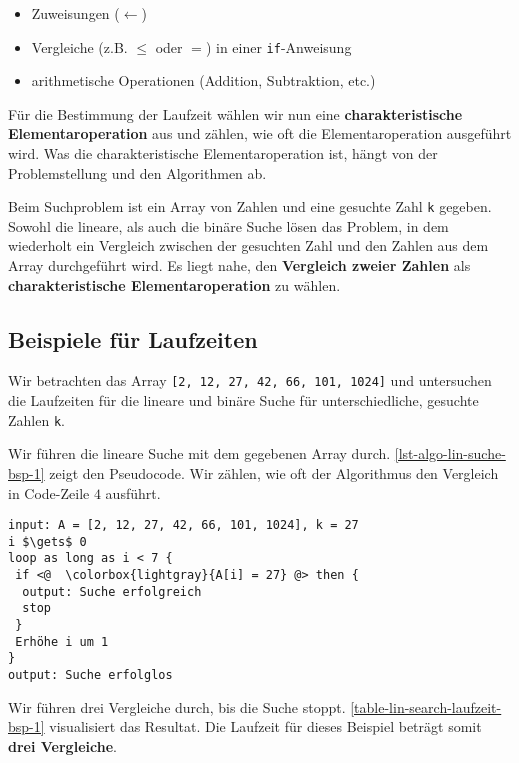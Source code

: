 \begin{itemize}
	\item Zuweisungen ($\gets$)
	\item Vergleiche (z.B. $\leq$ oder $=$) in einer \lstinline[language=pseudocode]{if}-Anweisung
	\item arithmetische Operationen (Addition, Subtraktion, etc.)
\end{itemize}

Für die Bestimmung der Laufzeit wählen wir nun eine \textbf{charakteristische Elementaroperation} aus und zählen, wie oft die Elementaroperation ausgeführt wird. Was die charakteristische Elementaroperation ist, hängt von der Problemstellung und den Algorithmen ab.

\begin{example}
	Beim Suchproblem ist ein Array von Zahlen und eine gesuchte Zahl \lstinline[language=pseudocode]{k} gegeben. Sowohl die lineare, als auch die binäre Suche lösen das Problem, in dem wiederholt ein Vergleich zwischen der gesuchten Zahl und den Zahlen aus dem Array durchgeführt wird. Es liegt nahe, den \textbf{Vergleich zweier Zahlen} als \textbf{charakteristische Elementaroperation} zu wählen.
\end{example}

\subsection{Beispiele für Laufzeiten}

Wir betrachten das Array \lstinline{[2, 12, 27, 42, 66, 101, 1024]} und untersuchen die Laufzeiten für die lineare und binäre Suche für unterschiedliche, gesuchte Zahlen \lstinline[language=pseudocode]{k}.

\begin{example}[\texttt{k = 27}]
	Wir führen die lineare Suche mit dem gegebenen Array durch. \autoref{lst-algo-lin-suche-bsp-1} zeigt den Pseudocode. Wir zählen, wie oft der Algorithmus den Vergleich in Code-Zeile $4$ ausführt.
	\begin{lstlisting}[language={pseudocode}, caption={Lineare Suche für $n = 7$ und \texttt{k = 27}.}, label={lst-algo-lin-suche-bsp-1}]
input: A = [2, 12, 27, 42, 66, 101, 1024], k = 27
i $\gets$ 0
loop as long as i < 7 {
 if <@  \colorbox{lightgray}{A[i] = 27} @> then {
  output: Suche erfolgreich
  stop
 }
 Erhöhe i um 1
}
output: Suche erfolglos
\end{lstlisting}

Wir führen drei Vergleiche durch, bis die Suche stoppt. \autoref{table-lin-search-laufzeit-bsp-1} visualisiert das Resultat. Die Laufzeit für dieses Beispiel beträgt somit \textbf{drei Vergleiche}.
\end{example}

